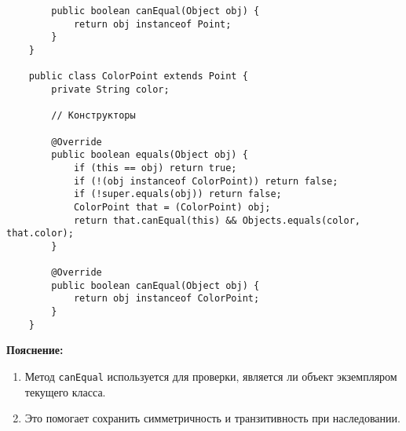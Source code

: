 \begin{enumerate}
\begin{verbatim}
        public boolean canEqual(Object obj) {
            return obj instanceof Point;
        }
    }

    public class ColorPoint extends Point {
        private String color;

        // Конструкторы

        @Override
        public boolean equals(Object obj) {
            if (this == obj) return true;
            if (!(obj instanceof ColorPoint)) return false;
            if (!super.equals(obj)) return false;
            ColorPoint that = (ColorPoint) obj;
            return that.canEqual(this) && Objects.equals(color, that.color);
        }

        @Override
        public boolean canEqual(Object obj) {
            return obj instanceof ColorPoint;
        }
    }
    \end{verbatim}
    
    \textbf{Пояснение:}
    \begin{enumerate}
        \item Метод \texttt{canEqual} используется для проверки, является ли объект экземпляром текущего класса.
        \item Это помогает сохранить симметричность и транзитивность при наследовании.
    \end{enumerate}
    
\end{enumerate}